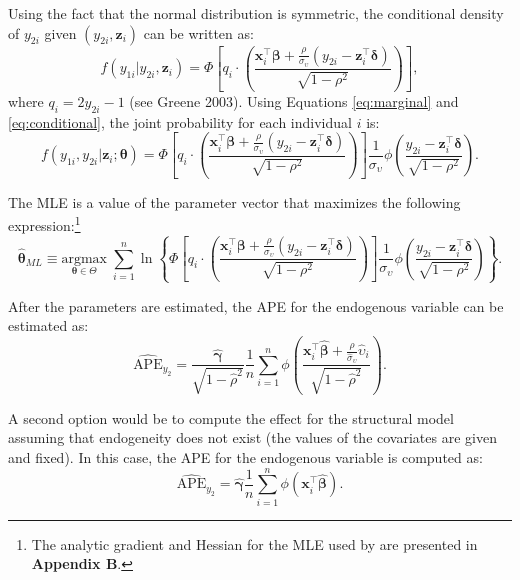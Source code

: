 Using the fact that the normal distribution is symmetric, the conditional density of \(y_{2i}\) given \((y_{2i}, \mathbf z_i)\) can be written as:
\begin{equation}
f(y_{1i}|y_{2i}, \mathbf z_i)= \Phi\left[q_i\cdot\left(\frac{\mathbf x_i^\top\boldsymbol \beta+ \frac{\rho}{\sigma_{\upsilon}}\left(y_{2i} - \mathbf z_i^\top\boldsymbol \delta\right)}{\sqrt{1 - \rho^2}}\right)\right],
\label{eq:conditional}
\end{equation}
where \(q_i = 2y_{2i} - 1\) (see Greene 2003). Using Equations \eqref{eq:marginal} and \eqref{eq:conditional}, the joint probability for each individual \(i\) is:
\begin{equation}
f(y_{1i}, y_{2i}|\mathbf z_i;\boldsymbol \theta) = \Phi\left[q_i\cdot\left(\frac{\mathbf x_i^\top\boldsymbol \beta+ \frac{\rho}{\sigma_{\upsilon}}\left(y_{2i} - \mathbf z_i^\top\boldsymbol \delta\right)}{\sqrt{1 - \rho^2}}\right)\right]\frac{1}{\sigma_{\upsilon}}\phi\left(\frac{y_{2i} -\mathbf z_i^\top\boldsymbol \delta}{\sqrt{1 - \rho^2}}\right).
\label{eq:piml}
\end{equation}

The MLE is a value of the parameter vector that maximizes the following expression:\footnote{The analytic gradient and Hessian for the MLE used by  are presented in \textbf{Appendix B}.}
\begin{equation*}
    \widehat{\boldsymbol \theta}_{ML} \equiv \underset{\boldsymbol \theta\in \boldsymbol \varTheta}{\textrm{argmax}}\; \sum_{i = 1}^n \ln \left\lbrace \Phi\left[q_i\cdot\left(\frac{\mathbf x_i^\top\boldsymbol \beta+ \frac{\rho}{\sigma_{\upsilon}}\left(y_{2i} - \mathbf z_i^\top\boldsymbol \delta\right)}{\sqrt{1 - \rho^2}}\right)\right]\frac{1}{\sigma_{\upsilon}}\phi\left(\frac{y_{2i} -\mathbf z_i^\top\boldsymbol \delta}{\sqrt{1 - \rho^2}}\right)\right\rbrace.
\end{equation*}

After the parameters are estimated, the APE for the endogenous variable can be estimated as:
\begin{equation}
\widehat{\textrm{APE}}_{y_2} = \frac{\widehat{\boldsymbol \gamma}}{\sqrt{1 - \widehat{\rho}^2}}\frac{1}{n}\sum_{i=1}^n\phi\left(\frac{\mathbf x_i^\top\widehat{\boldsymbol \beta} + \frac{\widehat{\rho}}{\widehat{\sigma}_{\upsilon}}\widehat{\upsilon}_i}{\sqrt{1 - \widehat{\rho}^2}}\right).
\label{eq:ME1y2ivprobit}
\end{equation}

A second option would be to compute the effect for the structural model assuming that endogeneity does not exist (the values of the covariates are given and fixed). In this case, the APE for the endogenous variable is computed as:
\begin{equation}
\widehat{\textrm{APE}}_{y_2} = \widehat{\boldsymbol \gamma}\frac{1}{n}\sum_{i=1}^n\phi\left(\mathbf x_i^\top\widehat{\boldsymbol \beta}\right).
\label{eq:ME2y2ivprobit}
\end{equation}

